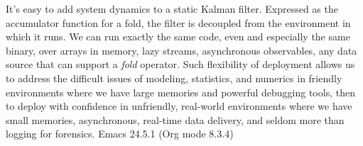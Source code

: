 \documentclass[10pt,oneside,x11names]{article}
\begin{document}
It's easy to add system dynamics to a static Kalman filter. Expressed as the
accumulator function for a fold, the filter is decoupled from the environment in
which it runs. We can run exactly the same code, even and especially the same
binary, over arrays in memory, lazy streams, asynchronous observables, any data
source that can support a \emph{fold} operator. Such flexibility of deployment allows
us to address the difficult issues of modeling, statistics, and numerics in
friendly environments where we have large memories and powerful debugging tools,
then to deploy with confidence in unfriendly, real-world environments where we
have small memories, asynchronous, real-time data delivery, and seldom more than
logging for forensics.
Emacs 24.5.1 (Org mode 8.3.4)
\end{document}
